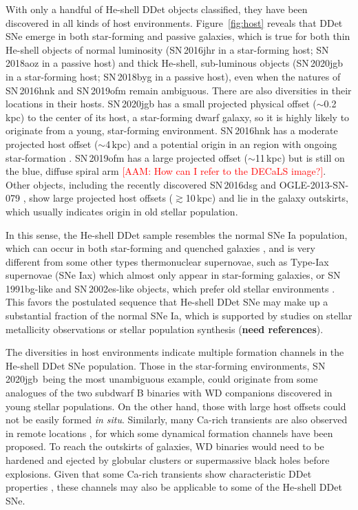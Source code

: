 \documentclass[twocolumn]{aastex631}
\newcommand{\sn}{SN\,2020jgb}
\newcommand{\adam}[1]{\textcolor{red}{[AAM: #1]}}
\begin{document}
With only a handful of He-shell DDet objects classified, they have been discovered in all kinds of host environments. Figure~\ref{fig:host} reveals that DDet SNe emerge in both star-forming and passive galaxies, which is true for both thin He-shell objects of normal luminosity (SN\,2016jhr in a star-forming host; SN\,2018aoz in a passive host) and thick He-shell, sub-luminous objects (SN\,2020jgb in a star-forming host; SN\,2018byg in a passive host), even when the natures of SN\,2016hnk and SN\,2019ofm remain ambiguous. There are also diversities in their locations in their hosts. SN\,2020jgb has a small projected physical offset ($\sim$0.2\,kpc) to the center of its host, a star-forming dwarf galaxy, so it is highly likely to originate from a young, star-forming environment. SN\,2016hnk has a moderate projected host offset ($\sim$4\,kpc) and a potential origin in an  region with ongoing star-formation \citep{galbany_16hnk_2019}. SN\,2019ofm has a large projected offset ($\sim$11\,kpc) but is still on the blue, diffuse spiral arm \adam{How can I refer to the DECaLS image?}. Other objects, including the recently discovered SN\,2016dsg and OGLE-2013-SN-079 \citep{Dong_16dsg_2022}, show large projected host offsets ($\gtrsim$10\,kpc) and lie in the galaxy outskirts, which usually indicates origin in old stellar population.

In this sense, the He-shell DDet sample resembles the normal SNe Ia population, which can occur in both star-forming and quenched galaxies \citep[e.g.,][]{Sullivan_2006, Smith_2012}, and is very different from some other types thermonuclear supernovae, such as Type-Iax supernovae (SNe Iax) which almost only appear in star-forming galaxies, or SN\,1991bg-like and SN\,2002es-like objects, which prefer old stellar environments \citep[see the review in][]{Jha_2019}. This favors the postulated sequence that He-shell DDet SNe may make up a substantial fraction of the normal SNe Ia, which is supported by studies on stellar metallicity observations \citep{Eitner_2022} or stellar population synthesis (\textbf{need references}).

The diversities in host environments indicate multiple formation channels in the He-shell DDet SNe population. Those in the star-forming environments, \sn\ being the most unambiguous example, could originate from some analogues of the two subdwarf B binaries with WD companions \citep{Geier_2013, Kupfer_2022} discovered in young stellar populations.
On the other hand, those with large host offsets could not be easily formed {\it in situ}. Similarly, many Ca-rich transients are also observed in remote locations \citep{Lunnan_2017}, for which some dynamical formation channels have been proposed. To reach the outskirts of galaxies, WD binaries would need to be hardened and ejected by globular clusters \citep{Shen_2019} or supermassive black holes \citep{Foley_2015} before explosions. Given that some Ca-rich transients show characteristic DDet properties \citep{de_Ca_rich_2020}, these channels may also be applicable to some of the He-shell DDet SNe. 
\end{document}
